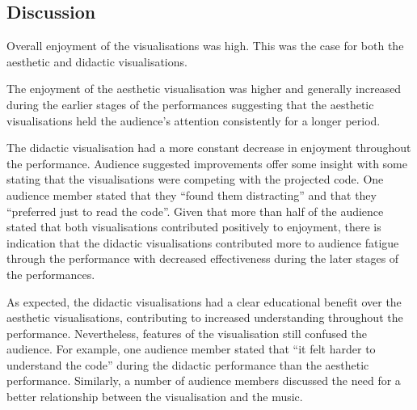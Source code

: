 \documentclass{sig-alternate}
\begin{document}


\subsection{Discussion}

Overall enjoyment of the visualisations was high. This was the case for both the aesthetic and didactic visualisations.

The enjoyment of the aesthetic visualisation was higher and generally increased during the earlier stages of the performances suggesting that the aesthetic visualisations held the audience's attention consistently for a longer period.

The didactic visualisation had a more constant decrease in enjoyment throughout the performance. Audience suggested improvements offer some insight with some stating that the visualisations were competing with the projected code. One audience member stated that they ``found them distracting'' and that they ``preferred just to read the code''. Given that more than half of the audience stated that both visualisations contributed positively to enjoyment, there is indication that the didactic visualisations contributed more to audience fatigue through the performance with decreased effectiveness during the later stages of the performances.

As expected, the didactic visualisations had a clear educational benefit over the aesthetic visualisations, contributing to increased understanding throughout the performance. Nevertheless, features of the visualisation still confused the audience. For example, one audience member stated that ``it felt harder to understand the code'' during the didactic performance than the aesthetic performance. Similarly, a number of audience members discussed the need for a better relationship between the visualisation and the music.
\end{document}
